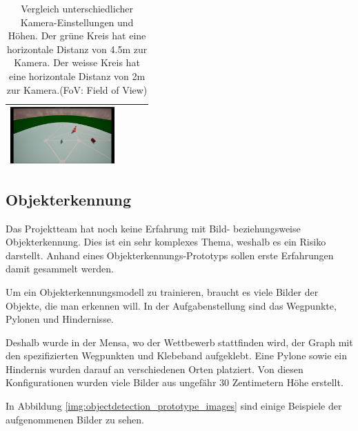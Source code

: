 \documentclass[../main.tex]{subfiles}
\begin{document}
\begin{table}[H]
\begin{tabular}{|c|c|c|c|}
        \includegraphics[width=4cm]{img/unrealengine/h75_f120_w45.png} \\
        \hline
    \end{tabular}
    \caption{Vergleich unterschiedlicher Kamera-Einstellungen und Höhen. Der grüne Kreis hat eine horizontale Distanz von 4.5m zur Kamera. Der weisse Kreis hat eine horizontale Distanz von 2m zur Kamera.(FoV: Field of View)}
\end{table}

\subsection{Objekterkennung}

Das Projektteam hat noch keine Erfahrung mit Bild- beziehungsweise Objekterkennung.  
Dies ist ein sehr komplexes Thema, weshalb es ein Risiko darstellt.  
Anhand eines Objekterkennungs-Prototyps sollen erste Erfahrungen damit gesammelt werden.

Um ein Objekterkennungsmodell zu trainieren, braucht es viele Bilder der Objekte, die man erkennen will. In der Aufgabenstellung sind das Wegpunkte, Pylonen und Hindernisse.

Deshalb wurde in der Mensa, wo der Wettbewerb stattfinden wird, der Graph mit den spezifizierten Wegpunkten und Klebeband aufgeklebt. Eine Pylone sowie ein Hindernis wurden darauf an verschiedenen Orten platziert. Von diesen Konfigurationen wurden viele Bilder aus ungefähr 30 Zentimetern Höhe erstellt.

In Abbildung \ref{img:objectdetection_prototype_images} sind einige Beispiele der aufgenommenen Bilder zu sehen.
\end{document}

